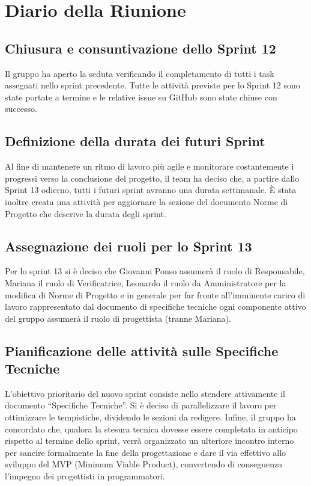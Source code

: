 \documentclass[a4paper, 11pt, oneside]{scrartcl} %
\begin{document}
\newpage
\section{Diario della Riunione}

\subsection{Chiusura e consuntivazione dello Sprint 12}
Il gruppo ha aperto la seduta verificando il completamento di tutti i task assegnati nello sprint precedente. Tutte le attività previste per lo Sprint 12 sono state portate a termine e le relative issue su GitHub sono state chiuse con successo.

\subsection{Definizione della durata dei futuri Sprint}
Al fine di mantenere un ritmo di lavoro più agile e monitorare costantemente i progressi verso la conclusione del progetto, il team ha deciso che, a partire dallo Sprint 13 odierno, tutti i futuri sprint avranno una durata settimanale. È stata inoltre creata una attività per aggiornare la sezione del documento Norme di Progetto che descrive la durata degli sprint.

\subsection{Assegnazione dei ruoli per lo Sprint 13}
Per lo sprint 13 si è deciso che Giovanni Ponso assumerà il ruolo di Responsabile, Mariana il ruolo di Verificatrice, Leonardo il ruolo da Amministratore per la modifica di Norme di Progetto e in generale per far fronte all'imminente carico di lavoro rappresentato dal documento di specifiche tecniche ogni componente attivo del gruppo assumerà il ruolo di progettista (tranne Mariana). 

\subsection{Pianificazione delle attività sulle Specifiche Tecniche}
L'obiettivo prioritario del nuovo sprint consiste nello stendere attivamente il documento ``Specifiche Tecniche''. Si è deciso di parallelizzare il lavoro per ottimizzare le tempistiche, dividendo le sezioni da redigere. Infine, il gruppo ha concordato che, qualora la stesura tecnica dovesse essere completata in anticipo rispetto al termine dello sprint, verrà organizzato un ulteriore incontro interno per sancire formalmente la fine della progettazione e dare il via effettivo allo sviluppo del MVP (Minimum Viable Product), convertendo di conseguenza l'impegno dei progettisti in programmatori.
\end{document}

